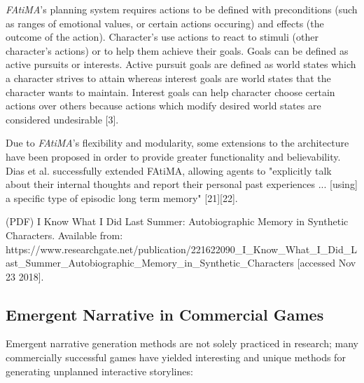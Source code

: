 \documentclass{sig-alternate-05-2015}
\begin{document}
\textit{FAtiMA}'s planning system requires actions to be defined with preconditions (such as ranges of emotional values, or certain actions occuring) and effects (the outcome of the action). Character's use actions to react to stimuli (other character's actions) or to help them achieve their goals. Goals can be defined as active pursuits or interests. Active pursuit goals are defined as world states which a character strives to attain whereas interest goals are world states that the character wants to maintain. Interest goals can help character choose certain actions over others because actions which modify desired world states are considered undesirable [3].

Due to \textit{FAtiMA}'s flexibility and modularity, some extensions to the architecture have been proposed in order to provide greater functionality and believability. Dias et al. successfully extended FAtiMA, allowing agents to "explicitly talk about their internal thoughts and report their personal past experiences ... [using] a specific type of episodic long term memory" [21][22].

(PDF) I Know What I Did Last Summer: Autobiographic Memory in Synthetic Characters. Available from: https://www.researchgate.net/publication/221622090_I_Know_What_I_Did_Last_Summer_Autobiographic_Memory_in_Synthetic_Characters [accessed Nov 23 2018].

\subsection{Emergent Narrative in Commercial Games}
Emergent narrative generation methods are not solely practiced in research; many commercially successful games have yielded interesting and unique methods for generating unplanned interactive storylines:
\end{document}

